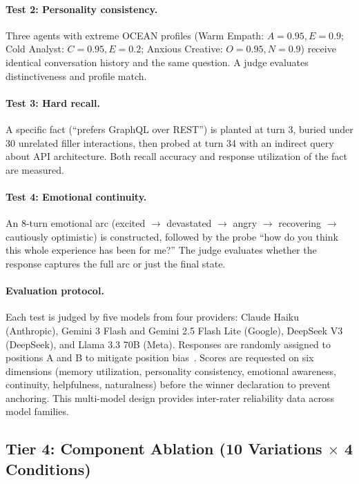 \documentclass{article}
\begin{document}
\paragraph{Test 2: Personality consistency.} Three agents with extreme OCEAN profiles (Warm Empath: $A = 0.95, E = 0.9$; Cold Analyst: $C = 0.95, E = 0.2$; Anxious Creative: $O = 0.95, N = 0.9$) receive identical conversation history and the same question. A judge evaluates distinctiveness and profile match.

\paragraph{Test 3: Hard recall.} A specific fact (``prefers GraphQL over REST'') is planted at turn 3, buried under 30 unrelated filler interactions, then probed at turn 34 with an indirect query about API architecture. Both recall accuracy and response utilization of the fact are measured.

\paragraph{Test 4: Emotional continuity.} An 8-turn emotional arc (excited $\rightarrow$ devastated $\rightarrow$ angry $\rightarrow$ recovering $\rightarrow$ cautiously optimistic) is constructed, followed by the probe ``how do you think this whole experience has been for me?'' The judge evaluates whether the response captures the full arc or just the final state.

\paragraph{Evaluation protocol.} Each test is judged by five models from four providers: Claude Haiku (Anthropic), Gemini 3 Flash and Gemini 2.5 Flash Lite (Google), DeepSeek V3 (DeepSeek), and Llama 3.3 70B (Meta). Responses are randomly assigned to positions A and B to mitigate position bias~\cite{shi2025positionbias}. Scores are requested on six dimensions (memory utilization, personality consistency, emotional awareness, continuity, helpfulness, naturalness) before the winner declaration to prevent anchoring. This multi-model design provides inter-rater reliability data across model families.

\subsection{Tier 4: Component Ablation (10 Variations $\times$ 4 Conditions)}
\end{document}
